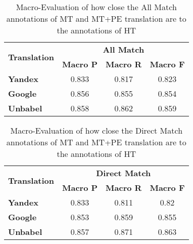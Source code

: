 \begin{table}[!htp]
\centering
\begin{tabular}{@{}lccc@{}}
\toprule
\multicolumn{1}{c}{\multirow{2}{*}{\textbf{Translation}}} & \multicolumn{3}{c}{\textbf{All Match}}                            \\ \cmidrule(l){2-4}
\multicolumn{1}{c}{}          & \textbf{Macro P}     & \textbf{Macro R}      & \textbf{Macro F}          \\ \midrule
\textbf{Yandex}   & 0.833                & 0.817                 & 0.823                   \\ 

\textbf{Google}   & 0.856                & 0.855                 & 0.854                   \\ 

\textbf{Unbabel}  & 0.858                & 0.862                 & 0.859         \\ \bottomrule 

\end{tabular}%
\caption{Macro-Evaluation of how close the All Match annotations of MT and MT+PE translation are to the annotations of HT}
\label{table: Results All Match Macro}
\end{table}


\begin{table}[!htp]
\centering
\begin{tabular}{@{}lccc@{}}
\toprule
\multicolumn{1}{c}{\multirow{2}{*}{\textbf{Translation}}} & \multicolumn{3}{c}{\textbf{Direct Match}}                            \\ \cmidrule(l){2-4}
\multicolumn{1}{c}{}          & \textbf{Macro P}     & \textbf{Macro R}      & \textbf{Macro F}          \\ \midrule
\textbf{Yandex}   & 0.833                & 0.811                 & 0.82                   \\ 

\textbf{Google}   & 0.853                & 0.859                 & 0.855                   \\ 

\textbf{Unbabel}  & 0.857                & 0.871                 & 0.863         \\ \bottomrule 

\end{tabular}%
\caption{Macro-Evaluation of how close the Direct Match annotations of MT and MT+PE translation are to the annotations of HT}
\label{table: Results Direct Match Macro}
\end{table}












